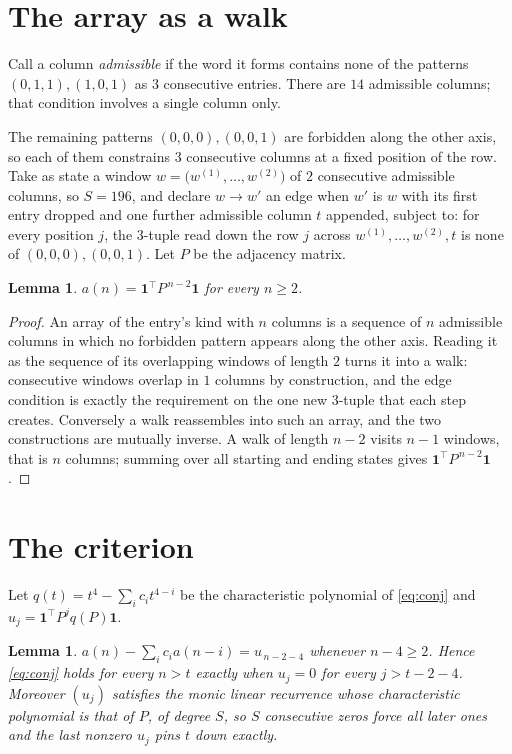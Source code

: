 \documentclass[11pt,a4paper]{article}
\theoremstyle{plain}
\newtheorem{lemma}[theorem]{Lemma}
\theoremstyle{definition}
\begin{document}
\section{The array as a walk}

Call a column \emph{admissible} if the word it forms contains none of the patterns
$(0,1,1), (1,0,1)$ as $3$ consecutive entries. There are $14$ admissible columns; that condition
involves a single column only.

The remaining patterns $(0,0,0), (0,0,1)$ are forbidden along the other axis, so each of them
constrains $3$ consecutive columns at a fixed position of the row. Take as state a
window $w=\bigl(w^{(1)},\dots,w^{(2)}\bigr)$ of $2$ consecutive admissible
columns, so $S=196$, and declare $w\to w'$ an edge when $w'$ is $w$ with its first entry
dropped and one further admissible column $t$ appended, subject to: for every position
$j$, the $3$-tuple read down the row $j$ across $w^{(1)},\dots,w^{(2)},t$
is none of $(0,0,0), (0,0,1)$. Let $P$ be the adjacency matrix.

\begin{lemma}\label{lem:walk}
$a(n)=\mathbf{1}^{\!\top}P^{\,n-2}\mathbf{1}$ for every $n\ge2$.
\end{lemma}

\begin{proof}
An array of the entry's kind with $n$ columns is a sequence of $n$ admissible columns in
which no forbidden pattern appears along the other axis. Reading it as the sequence of its
overlapping windows of length $2$ turns it into a walk: consecutive windows overlap in
$1$ columns by construction, and the edge condition is exactly the requirement on the one
new $3$-tuple that each step creates. Conversely a walk reassembles into such an array,
and the two constructions are mutually inverse. A walk of length $n-2$ visits $n-1$
windows, that is $n$ columns; summing over all starting and ending states gives
$\mathbf{1}^{\!\top}P^{\,n-2}\mathbf{1}$.
\end{proof}

\section{The criterion}

Let $q(t)=t^{4}-\sum_i c_i t^{4-i}$ be the characteristic polynomial of
\eqref{eq:conj} and $u_j=\mathbf{1}^{\!\top}P^{j}q(P)\mathbf{1}$.

\begin{lemma}\label{lem:crit}
$a(n)-\sum_i c_i a(n-i)=u_{\,n-2-4}$ whenever $n-4\ge2$. Hence
\eqref{eq:conj} holds for every $n>t$ exactly when $u_j=0$ for every
$j>t-2-4$. Moreover $(u_j)$ satisfies the monic linear recurrence whose
characteristic polynomial is that of $P$, of degree $S$, so $S$ consecutive zeros force all
later ones and the last nonzero $u_j$ pins $t$ down exactly.
\end{lemma}
\end{document}
